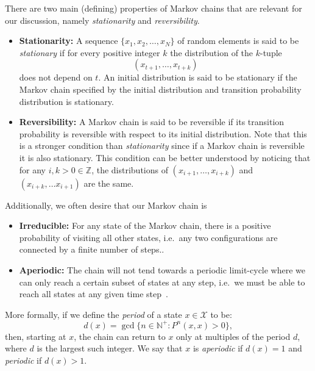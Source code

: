 \documentclass[../main.tex]{subfiles}
\begin{document}
There are two main (defining) properties of Markov chains that are relevant for
our discussion, namely \emph{stationarity} and \emph{reversibility}.
%
\begin{itemize}
  \item \textbf{Stationarity:} A sequence $\{x_1, x_2, \ldots, x_N\}$ of random
    elements is said to be \emph{stationary} if for every positive integer $k$
    the distribution of the $k$-tuple
    \begin{equation*}
      (x_{t+1}, \ldots, x_{t+k})
    \end{equation*}
    does not depend on $t$. An initial distribution is said to be stationary if
    the Markov chain specified by the initial distribution and transition
    probability distribution is stationary. 
  \item \textbf{Reversibility:} A Markov chain is said to be reversible if its
    transition probability is reversible with respect to its initial
    distribution. Note that this is a stronger condition than
    \emph{stationarity} since if a Markov chain is reversible it is also
    stationary. This condition can be better understood by noticing that for
    any $i, k  > 0 \in \mathbb{Z}$, the distributions of $(x_{i+1}, \ldots,
    x_{i+k})$ and $(x_{i+k}, \ldots x_{i+1})$ are the same.
\end{itemize}
%
Additionally, we often desire that our Markov chain is
\begin{itemize}
  \item \textbf{Irreducible:} For any state of the Markov chain, there is a
    positive probability of visiting all other states, i.e.\ any two
    configurations are connected by a finite number of steps..
  \item \textbf{Aperiodic:} The chain will not tend towards a periodic
    limit-cycle where we can only reach a certain subset of states at any step,
    i.e.\ we must be able to reach all states at any given time
    step~\cite{scribeno74:online}.
%
\end{itemize}
More formally, if we define the \emph{period} of a state $x \in \mathcal{X}$
to be:
%
\begin{equation}
  d(x) = \gcd\{n \in \mathbb{N}^{+} : P^{n}(x, x) > 0\},
\end{equation}
%
then, starting at $x$, the chain can return to $x$ only at multiples of the
period $d$, where $d$ is the largest such integer. We say that $x$ is
\emph{aperiodic} if $d(x) = 1$ and \emph{periodic} if $d(x) > 1$.
\end{document}
